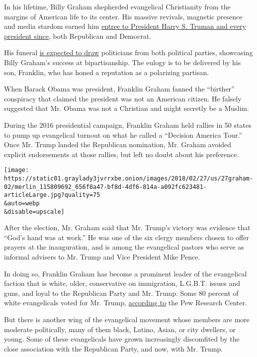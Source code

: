 In his lifetime, Billy Graham shepherded evangelical Christianity from
the margins of American life to its center. His massive revivals,
magnetic presence and media stardom earned him
\href{https://billygraham.org/gallery/billy-graham-pastor-to-the-presidents/}{entree
to President Harry S. Truman and every president since}, both Republican
and Democrat.

His funeral
\href{http://www.charlotteobserver.com/news/local/article201496869.html}{is
expected to draw} politicians from both political parties, showcasing
Billy Graham's success at bipartisanship. The eulogy is to be delivered
by his son, Franklin, who has honed a reputation as a polarizing
partisan.

When Barack Obama was president, Franklin Graham fanned the ``birther''
conspiracy that claimed the president was not an American citizen. He
falsely suggested that Mr. Obama was not a Christian and might secretly
be a Muslim.

During the 2016 presidential campaign, Franklin Graham held rallies in
50 states to pump up evangelical turnout on what he called a ``Decision
America Tour.'' Once Mr. Trump landed the Republican nomination, Mr.
Graham avoided explicit endorsements at those rallies, but left no doubt
about his preference.

\texttt{[image: https://static01.graylady3jvrrxbe.onion/images/2018/02/27/us/27graham-02/merlin\_115809692\_656f8a47-bf8d-4df6-814a-a092fc623481-articleLarge.jpg?quality=75\\\&auto=webp\\\&disable=upscale]}

After the election, Mr. Graham said that Mr. Trump's victory was
evidence that ``God's hand was at work.'' He was one of the six clergy
members chosen to offer prayers at the inauguration, and is among the
evangelical pastors who serve as informal advisers to Mr. Trump and Vice
President Mike Pence.

In doing so, Franklin Graham has become a prominent leader of the
evangelical faction that is white, older, conservative on immigration,
L.G.B.T. issues and guns, and loyal to the Republican Party and Mr.
Trump. Some 80 percent of white evangelicals voted for Mr. Trump,
\href{http://www.pewresearch.org/fact-tank/2016/11/09/how-the-faithful-voted-a-preliminary-2016-analysis/}{according
to} the Pew Research Center.

But there is another wing of the evangelical movement whose members are
more moderate politically, many of them black, Latino, Asian, or city
dwellers, or young. Some of these evangelicals have grown increasingly
discomfited by the close association with the Republican Party, and now,
with Mr. Trump.

